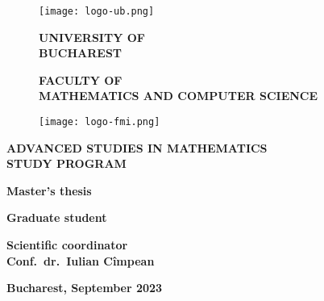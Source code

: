\begin{titlepage}


\begin{figure}[!htb]
    \centering
    \begin{minipage}{0.2\textwidth}
        \texttt{[image: logo-ub.png]}
    \end{minipage}
    \begin{minipage}{0.5\textwidth}
        \large
        \vspace{0.2cm}
        \begin{center}
            \textbf{UNIVERSITY OF \\ BUCHAREST}
        \end{center}
        \vspace{0.3cm}
        \begin{center}
            \textbf{
                FACULTY OF \\
                MATHEMATICS AND COMPUTER SCIENCE
            }
        \end{center}
    \end{minipage}
    \begin{minipage}{0.2\textwidth}
        \texttt{[image: logo-fmi.png]}
    \end{minipage}
\end{figure}

\begin{center}
\textbf{ADVANCED STUDIES IN MATHEMATICS \\ STUDY PROGRAM}
\end{center}

\vspace{1cm}

\begin{center}
\Large \textbf{Master's thesis}
\end{center}

\begin{center}
\huge \textbf{\MakeUppercase{\@title}}
\end{center}

\vspace{3cm}

\begin{center}
\large \textbf{Graduate student \\ \@author}
\end{center}

\vspace{0.25cm}

\begin{center}
\large \textbf{Scientific coordinator \\ Conf.\ dr.\ Iulian Cîmpean}
\end{center}

\vspace{2cm}

\begin{center}
\Large \textbf{Bucharest, September 2023}
\end{center}
\end{titlepage}